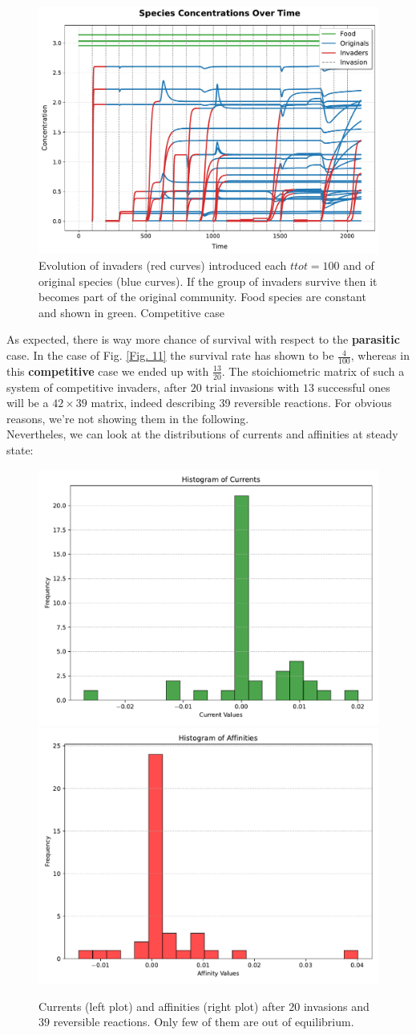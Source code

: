 \documentclass{article}
\begin{document}
\begin{figure}[H]
    \centering
    \includegraphics[width=0.6\linewidth]{Successive_species_concentrations_auto.pdf} 
    \caption{\small{Evolution of invaders (red curves) introduced each $ttot=100$ and of original species (blue curves). If the group of invaders survive then it becomes part of the original community. Food species are constant and shown in green. Competitive case}}
    \label{Fig. 15}
\end{figure}

As expected, there is way more chance of survival with respect to the \textbf{parasitic} case. In the case of Fig. \ref{Fig. 11} the survival rate has shown to be $\frac{4}{100}$, whereas in this \textbf{competitive} case we ended up with $\frac{13}{20}$. The stoichiometric matrix of such a system of competitive invaders, after $20$ trial invasions with $13$ successful ones will be a $42\times 39$ matrix, indeed describing 39 reversible reactions. For obvious reasons, we're not showing them in the following. \\ Nevertheles, we can look at the distributions of currents and affinities at steady state:

\begin{figure}[H]
	\centering
	\includegraphics[width=0.45\linewidth]{Currents_auto.pdf}
	\includegraphics[width=0.45\linewidth]{Affinities_auto.pdf} 
	\caption{\small{Currents (left plot) and affinities (right plot) after $20$ invasions and $39$ reversible reactions. Only few of them are out of equilibrium. }}
	\label{Fig. 16}
\end{figure}
\end{document}
